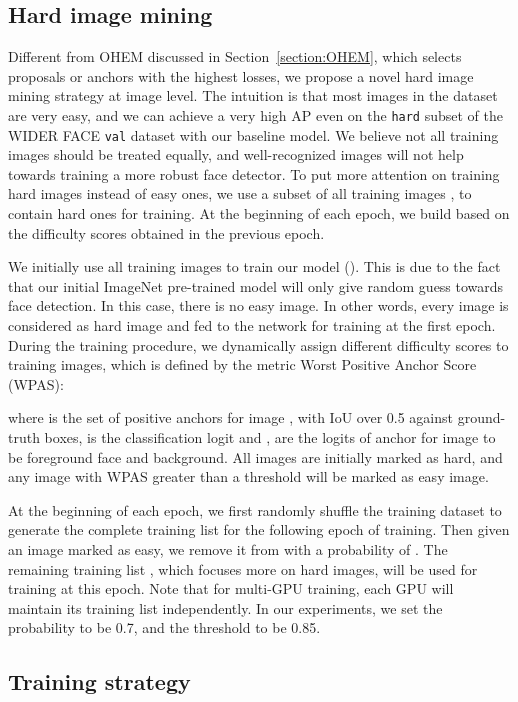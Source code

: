\documentclass[10pt,twocolumn,letterpaper]{article}
\begin{document}
\subsection{Hard image mining}\label{sec:HIM}
Different from OHEM discussed in Section~\ref{section:OHEM}, which selects proposals or anchors
with the highest losses,
we propose a novel
hard image mining strategy at image level. The intuition is that most images in the
dataset are very easy, and we can achieve a very high AP even on the \texttt{hard} subset
of the WIDER FACE \texttt{val}
dataset with our baseline model. We believe not all training images should be treated
equally, and well-recognized images will not help towards training a more robust
face detector. To put more attention on training hard images instead of easy ones,
we use a subset  of all training images , to contain hard ones for
training. At the beginning of each epoch, we build  based on
the difficulty scores obtained in the previous epoch.

We initially use all training images to train our model (\ie ). This is due to the fact that our
initial ImageNet pre-trained model will only give random guess towards face detection. In this case, there is no easy image. In other words, every image is considered as hard image and fed to the network for training at the first epoch.
During the training procedure, we dynamically assign different difficulty scores to training images, which is defined
by the metric Worst Positive Anchor Score (WPAS):

where  is the set of positive anchors for image ,
with IoU over 0.5 against ground-truth
boxes,  is the classification logit and ,
 are
the logits of anchor  for image  to be foreground face and background.
All images are initially marked as hard, and any image with WPAS greater than a threshold 
will be marked as easy image.

At the beginning of each epoch, we first randomly shuffle the training dataset to
generate the complete training list  for the following
epoch of training. Then
given an image marked as easy, we remove it from  with
a probability of .
The remaining training list , which focuses more on hard images,
will be used for training at this epoch. Note that for
multi-GPU training, each GPU will maintain its training list  independently.
In our experiments, we set the probability  to be 0.7, and the threshold  to be 0.85.


\subsection{Training strategy}\label{sec:train}
\end{document}
